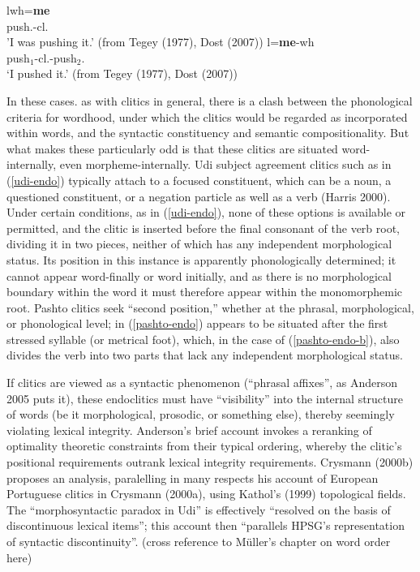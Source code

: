 \documentclass[output=paper]{langsci/langscibook}
\begin{document}
\begin{exe}
 \ex\label{pashto-endo}
   \begin{xlist}
     \ex\label{pashto-endo-a}
     \gll \textrtailt{}lwh=\textbf{me} \\
     push.-cl. \\
     \glt 'I was pushing it.' (from Tegey (1977), Dost (2007))
     \ex\label{pashto-endo-b}
     \gll \textrtailt{}l=\textbf{me}-wh \\
     push$_{1}$-cl.-push$_{2}$. \\
     \glt `I pushed it.' (from Tegey (1977), Dost (2007))
   \end{xlist}
\end{exe}

In these cases. as with clitics in general, there is a clash between the phonological criteria for wordhood, under which the clitics would be regarded as incorporated within words, and the syntactic constituency and semantic compositionality.
But what makes these particularly odd is that these clitics are situated word-internally, even morpheme-internally.
Udi subject agreement clitics such as  in (\ref{udi-endo}) typically attach to a focused constituent, which can be a noun, a questioned constituent, or a negation particle as well as a verb (Harris 2000).
Under certain conditions, as in (\ref{udi-endo}), none of these options is available or permitted, and the clitic is inserted before the final consonant of the verb root, dividing it in two pieces, neither of which has any independent morphological status.
Its position in this instance is apparently phonologically determined; it cannot appear word-finally or word initially, and as there is no morphological boundary within the word it must therefore appear within the monomorphemic root.
Pashto clitics seek ``second position,'' whether at the phrasal, morphological, or phonological level;  in (\ref{pashto-endo}) appears to be situated after the first stressed syllable (or metrical foot), which, in the case of (\ref{pashto-endo-b}), also divides the verb into two parts that lack any independent morphological status.

If clitics are viewed as a syntactic phenomenon (``phrasal affixes'', as Anderson 2005 puts it), these endoclitics must have ``visibility'' into the internal structure of words (be it morphological, prosodic, or something else), thereby seemingly violating lexical integrity.
Anderson's brief account invokes a reranking of optimality theoretic constraints from their typical ordering, whereby the clitic's positional requirements outrank lexical integrity requirements.
Crysmann (2000b) proposes an analysis, paralelling in many respects his account of European Portuguese clitics in Crysmann (2000a), using Kathol's (1999) topological fields.
The ``morphosyntactic paradox in Udi'' is effectively ``resolved on the basis of discontinuous lexical items''; this account then ``parallels HPSG's representation of syntactic discontinuity''.  (cross reference to M\"{u}ller's chapter on word order here)
\end{document}
